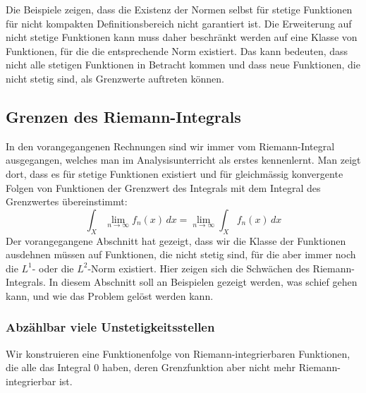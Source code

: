 Die Beispiele zeigen, dass die Existenz der Normen selbst für stetige
Funktionen für nicht kompakten Definitionsbereich nicht garantiert ist.
Die Erweiterung auf nicht stetige Funktionen kann muss daher beschränkt
werden auf eine Klasse von Funktionen, für die die entsprechende Norm
existiert.
Das kann bedeuten, dass nicht alle stetigen Funktionen in Betracht 
kommen und dass neue Funktionen, die nicht stetig sind, als
Grenzwerte auftreten können.

%
%
\subsection{Grenzen des Riemann-Integrals}
In den vorangegangenen Rechnungen sind wir immer vom Riemann-Integral
ausgegangen, welches man im Analysisunterricht als erstes kennenlernt.
Man zeigt dort, dass es für stetige Funktionen existiert und für
gleichmässig konvergente Folgen von Funktionen der Grenzwert des
Integrals mit dem Integral des Grenzwertes übereinstimmt:
\[
\int_X \lim_{n\to\infty} f_n(x)\,dx
=
\lim_{n\to\infty}
\int_X f_n(x)\,dx
\]
Der vorangegangene Abschnitt hat gezeigt, dass wir die Klasse der
Funktionen ausdehnen müssen auf Funktionen, die nicht stetig sind,
für die aber immer noch die $L^1$- oder die $L^2$-Norm existiert.
Hier zeigen sich die Schwächen des Riemann-Integrals.
In diesem Abschnitt soll an Beispielen gezeigt werden, was schief
gehen kann, und wie das Problem gelöst werden kann.

%
%
\subsubsection{Abzählbar viele Unstetigkeitsstellen}
Wir konstruieren eine Funktionenfolge von Riemann-integrierbaren 
Funktionen, die alle das Integral $0$ haben, deren Grenzfunktion
aber nicht mehr Riemann-integrierbar ist.


